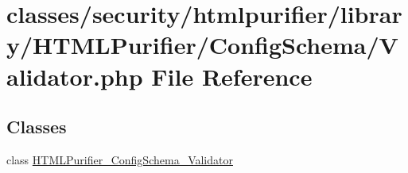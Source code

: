 \hypertarget{Validator_8php}{\section{classes/security/htmlpurifier/library/\+H\+T\+M\+L\+Purifier/\+Config\+Schema/\+Validator.php File Reference}
\label{Validator_8php}
}
\subsection*{Classes}
\begin{DoxyCompactItemize}
\item 
class \hyperlink{classHTMLPurifier__ConfigSchema__Validator}{H\+T\+M\+L\+Purifier\+\_\+\+Config\+Schema\+\_\+\+Validator}
\end{DoxyCompactItemize}
